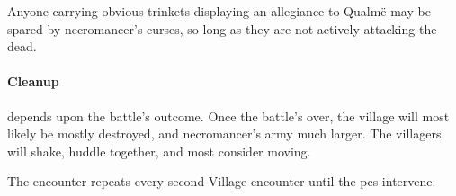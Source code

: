 Anyone carrying obvious trinkets displaying an allegiance to Qualm\"e may be spared by \gls{necromancer}'s curses, so long as they are not actively attacking the dead.

\paragraph{Cleanup} depends upon the battle's outcome.
Once the battle's over, the village will most likely be mostly destroyed, and \gls{necromancer}'s army much larger.  The villagers will shake, huddle together, and most consider moving.

The encounter repeats every second Village-encounter until the \glspl{pc} intervene.


